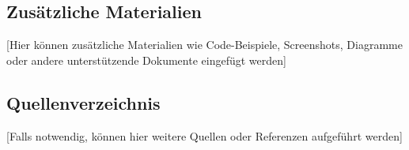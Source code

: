 \documentclass[11pt, a4paper, oneside, ngerman]{article}
\begin{document}
\subsection{Zusätzliche Materialien}\label{zusuxe4tzliche-materialien}

{[}Hier können zusätzliche Materialien wie Code-Beispiele, Screenshots,
Diagramme oder andere unterstützende Dokumente eingefügt werden{]}

\subsection{Quellenverzeichnis}\label{quellenverzeichnis}

{[}Falls notwendig, können hier weitere Quellen oder Referenzen
aufgeführt werden{]}
\end{document}
